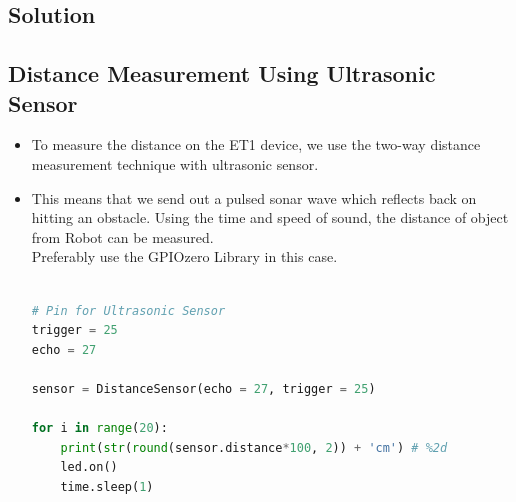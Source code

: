 

\subsection*{\Large Solution}

\subsection*{\Large Distance Measurement Using Ultrasonic Sensor}
    \begin{itemize}
        \item  To measure the distance on the ET1 device, we use the two-way distance measurement technique with ultrasonic sensor.\\
        \item This means that we send out a pulsed sonar wave which reflects back on hitting an obstacle.
        Using the time and speed of sound, the distance of object from Robot can be measured.\\
        Preferably use the GPIOzero Library in this case.
        
\begin{lstlisting}[language=Python]

# Pin for Ultrasonic Sensor
trigger = 25
echo = 27
    
sensor = DistanceSensor(echo = 27, trigger = 25)

for i in range(20):
    print(str(round(sensor.distance*100, 2)) + 'cm') # %2d
    led.on()
    time.sleep(1)

\end{lstlisting}
\end{itemize}
\newpage
